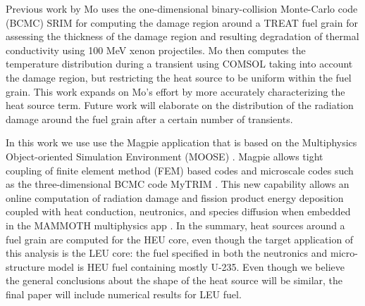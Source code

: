 \documentclass{anstrans}
\begin{document}

Previous work by Mo \cite{Mo2015} uses the one-dimensional binary-collision Monte-Carlo code (BCMC) SRIM \cite{SRIM} for computing the damage region around a TREAT fuel grain for assessing the thickness of the damage region and resulting degradation of thermal conductivity using 100 MeV xenon projectiles. Mo then computes the temperature distribution during a transient using COMSOL \cite{COMSOL} taking into account the damage region, but restricting the heat source to be uniform within the fuel grain. This work expands on Mo's effort by more accurately characterizing the heat source term. Future work will elaborate on the distribution of the radiation damage around the fuel grain after a certain number of transients.

In this work we use use the Magpie application that is based on the Multiphysics Object-oriented Simulation Environment (MOOSE) \cite{Moose}. Magpie allows tight coupling of finite element method (FEM) based codes and microscale codes such as the three-dimensional BCMC code MyTRIM \cite{MyTRIM}. This new capability allows an online computation of radiation damage and fission product energy deposition coupled with heat conduction, neutronics, and species diffusion when embedded in the MAMMOTH multiphysics app \cite{MAMMOTH}. In the summary, heat sources around a fuel grain are computed for the HEU core, even though the target application of this analysis is the LEU core: the fuel specified in both the neutronics and micro-structure model is HEU fuel containing mostly U-235. Even though we believe the general conclusions about the shape of the heat source will be similar, the final paper will include numerical results for LEU fuel.
\end{document}
